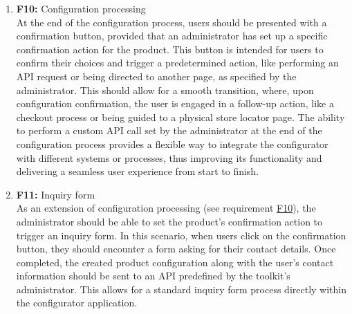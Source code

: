 \begin{enumerate}
\item \textbf{F10:} \label{itm:F10} Configuration processing
\vspace{2pt}
\\At the end of the configuration process, users should be presented with a confirmation button, provided that an administrator has set up a specific confirmation action for the product. This button is intended for users to confirm their choices and trigger a predetermined action, like performing an API request or being directed to another page, as specified by the administrator. This should allow for a smooth transition, where, upon configuration confirmation, the user is engaged in a follow-up action, like a checkout process or being guided to a physical store locator page. The ability to perform a custom API call set by the administrator at the end of the configuration process provides a flexible way to integrate the configurator with different systems or processes, thus improving its functionality and delivering a seamless user experience from start to finish.
\vspace{4pt}

\item \textbf{F11:} \label{itm:F11} Inquiry form
\vspace{2pt}
\\As an extension of configuration processing (see requirement \hyperref[itm:F10]{F10}), the administrator should be able to set the product's confirmation action to trigger an inquiry form. In this scenario, when users click on the confirmation button, they should encounter a form asking for their contact details. Once completed, the created product configuration along with the user's contact information should be sent to an API predefined by the toolkit's administrator. This allows for a standard inquiry form process directly within the configurator application.
\vspace{4pt}


\end{enumerate}
